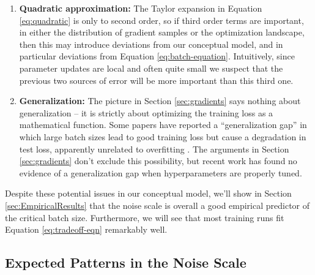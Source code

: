 \documentclass[english]{article}
\begin{document}
\begin{enumerate}
 \item \textbf{Quadratic approximation:} The Taylor expansion in Equation \ref{eq:quadratic} is only to second order, so if third order terms are important, in either the distribution of gradient samples or the optimization landscape, then this may introduce deviations from our conceptual model, and in particular deviations from Equation \ref{eq:batch-equation}. Intuitively, since parameter updates are local and often quite small we suspect that the previous two sources of error will be more important than this third one.
\item \textbf{Generalization:} The picture in Section \ref{sec:gradients} says nothing about generalization -- it is strictly about optimizing the training loss as a mathematical function. Some papers have reported a ``generalization gap'' in which large batch sizes lead to good training loss but cause a degradation in test loss, apparently unrelated to overfitting \cite{1609.04836,1705.08741}. The arguments in Section \ref{sec:gradients} don't exclude this possibility, but recent work \cite{1811.03600} has found no evidence of a generalization gap when hyperparameters are properly tuned.
\end{enumerate}
Despite these potential issues in our conceptual model, we'll show in Section \ref{sec:EmpiricalResults} that the noise scale is overall a good empirical predictor of the critical batch size. Furthermore, we will see that most training runs fit Equation \ref{eq:tradeoff-eqn} remarkably well.

\subsection{Expected Patterns in the Noise Scale}

\label{sec:ExpectationsforNS}
\end{document}
